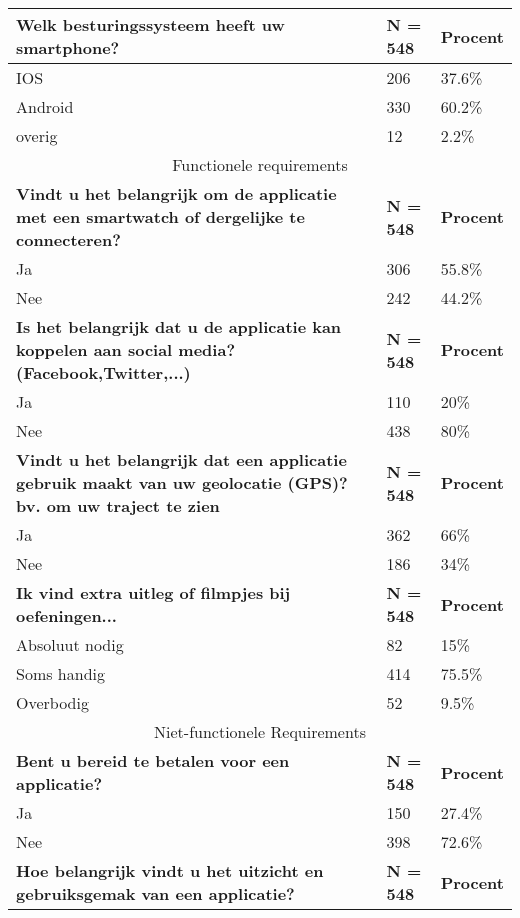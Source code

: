\vspace{1cm}
\begin{center}
\begin{tabular}{ |p{10cm}|p{2cm}|p{2cm}| }
 \hline
    \textbf{Welk besturingssysteem heeft uw smartphone?} & \textbf{N = 548} &\textbf{Procent}\\ 
 \hline
IOS   & 206    &37.6\%   \\
Android &   330  &60.2\%   \\
overig &   12  &2.2\%   \\
 \hline
 \multicolumn{3}{|c|}{Functionele requirements} \\
 \hline
     \textbf{Vindt u het belangrijk om de applicatie met een smartwatch of dergelijke te connecteren?} & \textbf{N = 548} &\textbf{Procent}\\ 
 \hline
Ja   & 306    &55.8\%   \\
Nee &   242  &44.2\%   \\
 \hline
     \textbf{Is het belangrijk dat u de applicatie kan koppelen aan social media? (Facebook,Twitter,...)} & \textbf{N = 548} &\textbf{Procent}\\ 
 \hline
Ja   & 110    &20\%   \\
Nee &   438  &80\%   \\
 \hline
      \textbf{Vindt u het belangrijk dat een applicatie gebruik maakt van uw geolocatie (GPS)? bv. om uw traject te zien} & \textbf{N = 548} &\textbf{Procent}\\ 
 \hline
Ja   & 362    &66\%   \\
Nee &   186  &34\%   \\
 \hline
       \textbf{Ik vind extra uitleg of filmpjes bij oefeningen...} & \textbf{N = 548} &\textbf{Procent}\\ 
 \hline
Absoluut nodig   & 82    &15\%   \\
Soms handig &   414  &75.5\%   \\
Overbodig &   52  &9.5\%   \\
  \hline
 \multicolumn{3}{|c|}{Niet-functionele Requirements} \\
 \hline
        \textbf{Bent u bereid te betalen voor een applicatie?} & \textbf{N = 548} &\textbf{Procent}\\ 
 \hline
Ja   & 150    &27.4\%   \\
Nee &   398  &72.6\%   \\
 \hline
         \textbf{Hoe belangrijk vindt u het uitzicht en gebruiksgemak van een applicatie?} & \textbf{N = 548} &\textbf{Procent}\\ 

\end{tabular}
\end{center}
